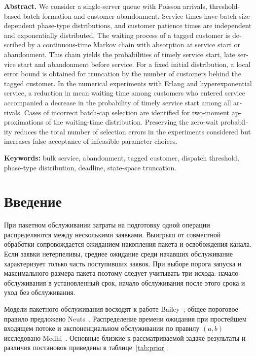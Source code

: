 \begin{otherlanguage}{english}
\noindent\textbf{Abstract.}
We consider a single-server queue with Poisson arrivals, threshold-based batch formation and customer abandonment. Service times have batch-size-dependent phase-type distributions, and customer patience times are independent and exponentially distributed. The waiting process of a tagged customer is described by a continuous-time Markov chain with absorption at service start or abandonment. This chain yields the probabilities of timely service start, late service start and abandonment before service. For a fixed initial distribution, a local error bound is obtained for truncation by the number of customers behind the tagged customer. In the numerical experiments with Erlang and hyperexponential service, a reduction in mean waiting time among customers who entered service accompanied a decrease in the probability of timely service start among all arrivals. Cases of incorrect batch-cap selection are identified for two-moment approximations of the waiting-time distribution. Preserving the zero-wait probability reduces the total number of selection errors in the experiments considered but increases false acceptance of infeasible parameter choices.

\medskip
\noindent\textbf{Keywords:} bulk service, abandonment, tagged customer, dispatch threshold, phase-type distribution, deadline, state-space truncation.
\end{otherlanguage}

\section*{Введение}

При пакетном обслуживании затраты на подготовку одной операции распределяются между несколькими заявками. Выигрыш от совместной обработки сопровождается ожиданием накопления пакета и освобождения канала. Если заявки нетерпеливы, среднее ожидание среди начавших обслуживание характеризует только часть поступивших заявок. При выборе порога запуска и максимального размера пакета поэтому следует учитывать три исхода: начало обслуживания в установленный срок, начало обслуживания после этого срока и уход без обслуживания.

Модели пакетного обслуживания восходят к работе Bailey~\cite{bailey1954}; общее пороговое правило предложено Neuts~\cite{neuts1967}. Распределение времени ожидания при простейшем входящем потоке и экспоненциальном обслуживании по правилу $(a,b)$ исследовано Medhi~\cite{medhi1975}. Основные близкие к рассматриваемой задаче результаты и различия постановок приведены в таблице~\ref{tab:prior}.

